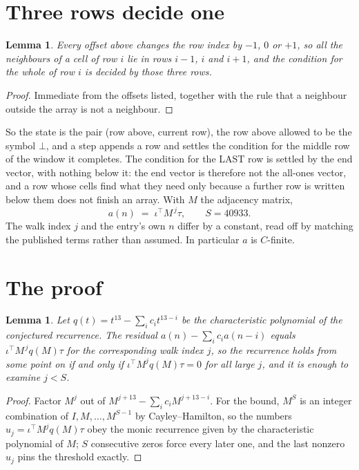 \documentclass[11pt,a4paper]{article}
\theoremstyle{plain}
\newtheorem{lemma}[theorem]{Lemma}
\theoremstyle{definition}
\begin{document}
\section{Three rows decide one}

\begin{lemma}\label{lem:win}
Every offset above changes the row index by $-1$, $0$ or $+1$, so all the neighbours of a cell
of row $i$ lie in rows $i-1$, $i$ and $i+1$, and the condition for the whole of row $i$ is
decided by those three rows.
\end{lemma}

\begin{proof}
Immediate from the offsets listed, together with the rule that a neighbour outside the array is
not a neighbour.
\end{proof}

So the state is the pair (row above, current row), the row above allowed to be the symbol
$\bot$, and a step appends a row and settles the condition for the middle row of the window it
completes. The condition for the LAST row is settled by the end vector, with nothing below it:
the end vector is therefore not the all-ones vector, and a row whose cells find what they need
only because a further row is written below them does not finish an array. With $M$ the
adjacency matrix,
\[
a(n)\;=\;\iota^{\!\top}M^{\,j}\tau ,\qquad S=40933.
\]
The walk index $j$ and the entry's own $n$ differ by a constant, read off by matching the
published terms rather than assumed. In particular $a$ is $C$-finite.

\section{The proof}

\begin{lemma}\label{lem:crit}
Let $q(t)=t^{13}-\sum_i c_it^{13-i}$ be the characteristic polynomial of the
conjectured recurrence. The residual $a(n)-\sum_ic_ia(n-i)$ equals
$\iota^{\!\top}M^{\,j}q(M)\tau$ for the corresponding walk index $j$, so the recurrence
holds from some point on if and only if $\iota^{\!\top}M^{j}q(M)\tau=0$ for all large $j$,
and it is enough to examine $j<S$.
\end{lemma}

\begin{proof}
Factor $M^{j}$ out of $M^{j+13}-\sum_ic_iM^{j+13-i}$. For the bound, $M^{S}$
is an integer combination of $I,M,\dots,M^{S-1}$ by Cayley--Hamilton, so the numbers
$u_j=\iota^{\!\top}M^{j}q(M)\tau$ obey the monic recurrence given by the characteristic
polynomial of $M$; $S$ consecutive zeros force every later one, and the last nonzero $u_j$
pins the threshold exactly.
\end{proof}
\end{document}
